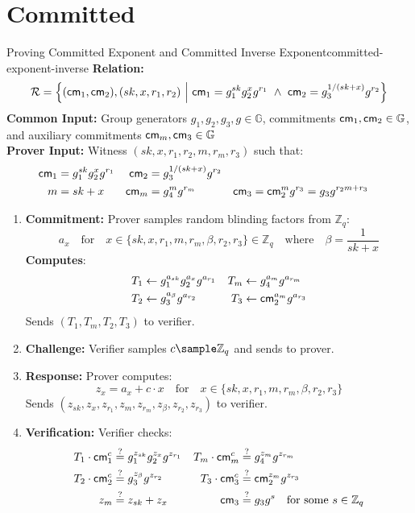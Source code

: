 \newpage
\section{Committed}

\begin{protocol}{Proving Committed Exponent and Committed Inverse Exponent}{committed-exponent-inverse}\label{pok-committed-exponent-inverse}
\textbf{Relation: }
\[
\mathcal{R} = \left\{ (\mathsf{cm}_1, \mathsf{cm}_2), (sk, x, r_1, r_2) \ \middle|\ \mathsf{cm}_1 = g_1^{sk} g_2^{x} g^{r_1} \ \land\ \mathsf{cm}_2 = g_3^{1/(sk + x)} g^{r_2} \right\}
\]
\textbf{Common Input:} Group generators $g_1, g_2, g_3, g \in \mathbb{G}$, commitments $\mathsf{cm}_1, \mathsf{cm}_2 \in \mathbb{G}$, and auxiliary commitments $\mathsf{cm}_m, \mathsf{cm}_3 \in \mathbb{G}$\\
\textbf{Prover Input:} Witness $(sk, x, r_1, r_2, m, r_m, r_3)$ such that:
    \begin{align*}
        \mathsf{cm}_1 &= g_1^{sk} g_2^{x} g^{r_1} & \mathsf{cm}_2 &= g_3^{1/(sk + x)} g^{r_2} \\
        m &= sk + x & \mathsf{cm}_m &= g_4^{m} g^{r_m} & \mathsf{cm}_3 &= \mathsf{cm}_2^{m} g^{r_3} = g_3 g^{r_2 m + r_3}
    \end{align*}
\begin{enumerate}
    \item \textbf{Commitment:} Prover samples random blinding factors from $\mathbb{Z}_q$:
       \[
        a_x \quad \text{for} \quad x \in \{ sk, x, r_1, m, r_m, \beta, r_2, r_3 \} \in \mathbb{Z}_q \quad \text{where} \quad \beta = \frac{1}{sk + x}
       \]
    \textbf{Computes}:
    \begin{align*}
        T_1 &\gets g_1^{a_{sk}} g_2^{a_x} g^{a_{r_1}} & T_m &\gets g_4^{a_m} g^{a_{r_m}} \\
        T_2 &\gets g_3^{a_\beta} g^{a_{r_2}} & T_3 &\gets \mathsf{cm}_2^{a_m} g^{a_{r_3}}
    \end{align*}
    Sends $(T_1, T_m, T_2, T_3)$ to verifier.
    
    \item \textbf{Challenge:} Verifier samples $c \sample \mathbb{Z}_q$ and sends to prover.
    
    \item \textbf{Response:} Prover computes:
    \[
    z_x = a_x + c \cdot x \quad \text{for} \quad x \in \{ sk, x, r_1, m, r_m, \beta, r_2, r_3 \}
    \]
    Sends $(z_{sk}, z_x, z_{r_1}, z_m, z_{r_m}, z_\beta, z_{r_2}, z_{r_3})$ to verifier.
    
    \item \textbf{Verification:} Verifier checks:
    \begin{align*}
        T_1 \cdot \mathsf{cm}_1^c &\stackrel{?}{=} g_1^{z_{sk}} g_2^{z_x} g^{z_{r_1}} &
        T_m \cdot \mathsf{cm}_m^c &\stackrel{?}{=} g_4^{z_m} g^{z_{r_m}} \\
        T_2 \cdot \mathsf{cm}_2^c &\stackrel{?}{=} g_3^{z_\beta} g^{z_{r_2}} &
        T_3 \cdot \mathsf{cm}_3^c &\stackrel{?}{=} \mathsf{cm}_2^{z_m} g^{z_{r_3}} \\
        z_m &\stackrel{?}{=} z_{sk} + z_x &
        \mathsf{cm}_3 &\stackrel{?}{=} g_3 g^{s} \quad \text{for some } s \in \mathbb{Z}_q
    \end{align*}
\end{enumerate}
\end{protocol}